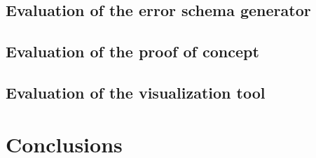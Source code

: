 \documentclass[english, 12pt, a4paper, sci, utf8, a-1b, online]{aaltothesis}
\begin{document}

\subsection{Evaluation of the error schema generator} 


\subsection{Evaluation of the proof of concept}


\subsection{Evaluation of the visualization tool}


\clearpage
\section{Conclusions}




\clearpage
\thesisbibliography



\end{document}
